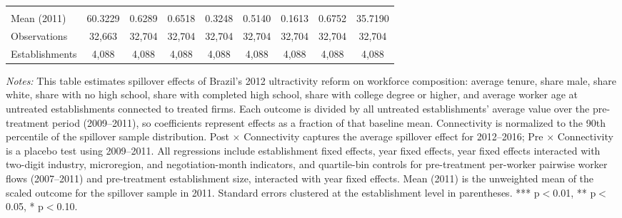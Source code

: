 \begin{table}[H]
\begin{threeparttable}
{\begin{tabular}{lcccccccc}
  &  &  &  &  &  &  &  & \\
Mean (2011) & 60.3229 & 0.6289 & 0.6518 & 0.3248 & 0.5140 & 0.1613 & 0.6752 & 35.7190 \\
Observations & 32{,}663 & 32{,}704 & 32{,}704 & 32{,}704 & 32{,}704 & 32{,}704 & 32{,}704 & 32{,}704 \\
Establishments & 4{,}088 & 4{,}088 & 4{,}088 & 4{,}088 & 4{,}088 & 4{,}088 & 4{,}088 & 4{,}088 \\
\bottomrule
\end{tabular}%
}
\scriptsize
\begin{tablenotes}
\item \textit{Notes:} This table estimates spillover effects of Brazil's 2012 ultractivity reform on workforce composition: average tenure, share male, share white, share with no high school, share with completed high school, share with college degree or higher, and average worker age at untreated establishments connected to treated firms. Each outcome is divided by all untreated establishments' average value over the pre-treatment period (2009--2011), so coefficients represent effects as a fraction of that baseline mean. Connectivity is normalized to the 90th percentile of the spillover sample distribution. Post $\times$ Connectivity captures the average spillover effect for 2012--2016; Pre $\times$ Connectivity is a placebo test using 2009--2011. All regressions include establishment fixed effects, year fixed effects, year fixed effects interacted with two-digit industry, microregion, and negotiation-month indicators, and quartile-bin controls for pre-treatment per-worker pairwise worker flows (2007--2011) and pre-treatment establishment size, interacted with year fixed effects. Mean (2011) is the unweighted mean of the scaled outcome for the spillover sample in 2011. Standard errors clustered at the establishment level in parentheses. *** p$<$0.01, ** p$<$0.05, * p$<$0.10.
\end{tablenotes}
\end{threeparttable}
\end{table}
